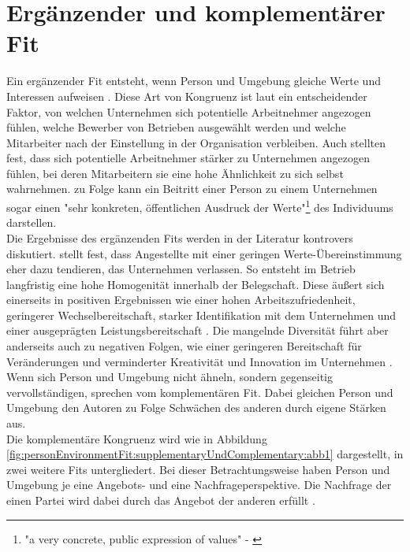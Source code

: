 \section{Ergänzender und komplementärer Fit}
\label{ch:personEnvironmentFit:supplementaryUndComplementary}
Ein ergänzender Fit entsteht, wenn Person und Umgebung gleiche Werte und Interessen aufweisen \cite[S. 2f.]{muchinsky:1987}. Diese Art von Kongruenz ist laut \textcite[S. 1ff.]{schneider:1987} ein entscheidender Faktor, von welchen Unternehmen sich potentielle Arbeitnehmer angezogen fühlen, welche Bewerber von Betrieben ausgewählt werden und welche Mitarbeiter nach der Einstellung in der Organisation verbleiben. Auch \textcite[S. 7]{devendorf:2008} stellten fest, dass sich potentielle Arbeitnehmer stärker zu Unternehmen angezogen fühlen, bei deren Mitarbeitern sie eine hohe Ähnlichkeit zu sich selbst wahrnehmen. \textcite[S. 4]{popovich:1982} zu Folge kann ein Beitritt einer Person zu einem Unternehmen sogar einen "sehr konkreten, öffentlichen Ausdruck der Werte"\footnote{"a very concrete, public expression of values" - \textcite[S. 4]{popovich:1982}} des Individuums darstellen.\\
Die Ergebnisse des ergänzenden Fits werden in der Literatur kontrovers diskutiert. \textcite[S. 6]{schneider:1987} stellt fest, dass Angestellte mit einer geringen Werte-Übereinstimmung eher dazu tendieren, das Unternehmen verlassen. So entsteht im Betrieb langfristig eine hohe Homogenität innerhalb der Belegschaft. Diese äußert sich einerseits in positiven Ergebnissen wie einer hohen Arbeitszufriedenheit, geringerer Wechselbereitschaft, starker Identifikation mit dem Unternehmen und einer ausgeprägten Leistungsbereitschaft \cite[S. 25ff.]{kristof:1996}\cite[S. 5]{su:2015}. Die mangelnde Diversität führt aber anderseits auch zu negativen Folgen, wie einer geringeren Bereitschaft für Veränderungen \cite[S. 10]{schneider:1987} und verminderter Kreativität und Innovation im Unternehmen \cite[S. 7]{chatman:1998}.\\
Wenn sich Person und Umgebung nicht ähneln, sondern gegenseitig vervollständigen, sprechen \textcite[S. 4]{muchinsky:1987} vom komplementären Fit. Dabei gleichen Person und Umgebung den Autoren zu Folge Schwächen des anderen durch eigene Stärken aus.\\
Die komplementäre Kongruenz wird wie in Abbildung \ref{fig:personEnvironmentFit:supplementaryUndComplementary:abb1} dargestellt, in zwei weitere Fits untergliedert. Bei dieser Betrachtungsweise haben Person und Umgebung je eine Angebots- und eine Nachfrageperspektive. Die Nachfrage der einen Partei wird dabei durch das Angebot der anderen erfüllt \cite[S. 2ff.]{caplan:1987}\cite[S. 2f.]{edwards:1991}.\\
